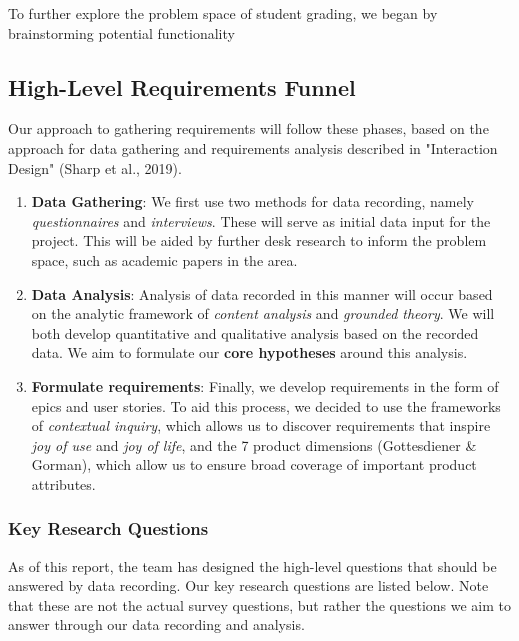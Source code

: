 To further explore the problem space of student grading, we began by brainstorming potential functionality 

\subsection{High-Level Requirements Funnel}

Our approach to gathering requirements will follow these phases, based on the approach for data gathering and requirements analysis described in "Interaction Design" (Sharp et al., 2019).

\begin{enumerate}
    \item \textbf{Data Gathering}: We first use two methods for data recording, namely \textit{questionnaires} and \textit{interviews}. These will serve as initial data input for the project. This will be aided by further desk research to inform the problem space, such as academic papers in the area.
    \item \textbf{Data Analysis}: Analysis of data recorded in this manner will occur based on the analytic framework of \textit{content analysis} and \textit{grounded theory}. We will both develop quantitative and qualitative analysis based on the recorded data. We aim to formulate our \textbf{core hypotheses} around this analysis.
    \item \textbf{Formulate requirements}: Finally, we develop requirements in the form of epics and user stories. To aid this process, we decided to use the frameworks of \textit{contextual inquiry}, which allows us to discover requirements that inspire \textit{joy of use} and \textit{joy of life}, and the 7 product dimensions (Gottesdiener \& Gorman), which allow us to ensure broad coverage of important product attributes.
\end{enumerate}

\subsubsection{Key Research Questions}
As of this report, the team has designed the high-level questions that should be answered by data recording. Our key research questions are listed below. Note that these are not the actual survey questions, but rather the questions we aim to answer through our data recording and analysis.

